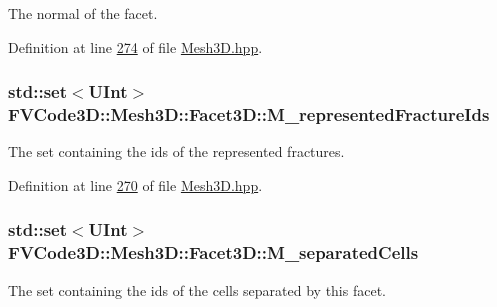 The normal of the facet. 



Definition at line \hyperlink{Mesh3D_8hpp_source_l00274}{274} of file \hyperlink{Mesh3D_8hpp_source}{Mesh3\+D.\+hpp}.

\subsubsection[{\texorpdfstring{M\+\_\+represented\+Fracture\+Ids}{M_representedFractureIds}}]{\setlength{\rightskip}{0pt plus 5cm}std\+::set$<${\bf U\+Int}$>$ F\+V\+Code3\+D\+::\+Mesh3\+D\+::\+Facet3\+D\+::\+M\+\_\+represented\+Fracture\+Ids\hspace{0.3cm}{\ttfamily [private]}}\hypertarget{classFVCode3D_1_1Mesh3D_1_1Facet3D_ad727210646d148f7af81755fb086310c}{}\label{classFVCode3D_1_1Mesh3D_1_1Facet3D_ad727210646d148f7af81755fb086310c}


The set containing the ids of the represented fractures. 



Definition at line \hyperlink{Mesh3D_8hpp_source_l00270}{270} of file \hyperlink{Mesh3D_8hpp_source}{Mesh3\+D.\+hpp}.

\subsubsection[{\texorpdfstring{M\+\_\+separated\+Cells}{M_separatedCells}}]{\setlength{\rightskip}{0pt plus 5cm}std\+::set$<${\bf U\+Int}$>$ F\+V\+Code3\+D\+::\+Mesh3\+D\+::\+Facet3\+D\+::\+M\+\_\+separated\+Cells\hspace{0.3cm}{\ttfamily [private]}}\hypertarget{classFVCode3D_1_1Mesh3D_1_1Facet3D_a17706f1909c2479234a70c5e8bc440dd}{}\label{classFVCode3D_1_1Mesh3D_1_1Facet3D_a17706f1909c2479234a70c5e8bc440dd}


The set containing the ids of the cells separated by this facet. 



